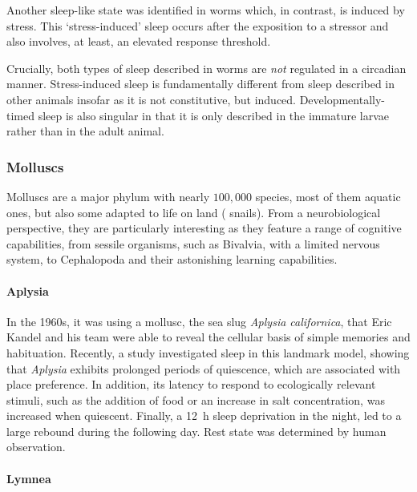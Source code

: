Another sleep-like state was identified in worms which, in contrast, is induced by stress.
This `stress-induced' sleep occurs after the exposition to a stressor and also involves, at least, an elevated response threshold\cite{hill_cellular_2014}.

Crucially, both types of sleep described in worms are \emph{not} regulated in a circadian manner.
Stress-induced sleep is fundamentally different from sleep described in other animals insofar as it is not constitutive, but induced. Developmentally-timed sleep is also singular in that it is only described in the immature larvae rather than in the adult animal.


\subsubsection{Molluscs}
Molluscs are a major phylum with nearly $100,000$ species, most of them aquatic ones, but also some adapted to life on land (\eg{} snails)\cite{rosenberg_new_2014}.
From a neurobiological perspective, they are particularly interesting as they feature a range of cognitive capabilities, from sessile organisms, such as Bivalvia, with a limited nervous system, to Cephalopoda and their astonishing learning capabilities.

\paragraph*{Aplysia}

In the 1960s, it was using a mollusc, the sea slug \emph{Aplysia californica},
that Eric Kandel and his team were able to reveal the cellular basis of simple memories and habituation\cite{kandel_mechanism_1964,milner_cognitive_1998}.
Recently, a study investigated sleep in this landmark model, showing that \emph{Aplysia}
exhibits prolonged periods of quiescence, which are associated with place preference\cite{vorster_characterization_2014}.
In addition, its latency to respond to ecologically relevant stimuli, such as the addition of food or an increase in salt concentration, was increased when quiescent. 
Finally, a 12~h sleep deprivation in the night, led to a large rebound during the following day.
Rest state was determined by human observation.

\paragraph*{Lymnea}

